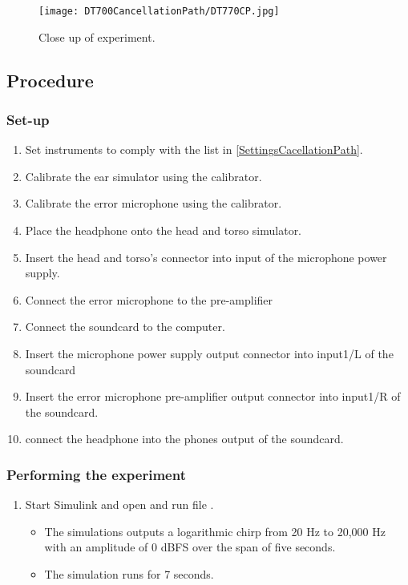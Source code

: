 \begin{figure}[H]
	\centering
	\texttt{[image: DT700CancellationPath/DT770CP.jpg]}
	\caption{Close up of experiment.}
	\label{DT770CloseUpCancellationPath}
\end{figure}
\newpage
\subsection{Procedure}
\subsubsection{Set-up}
\begin{enumerate}
	\item Set instruments to comply with the list in \ref{SettingsCacellationPath}.
	\item Calibrate the ear simulator using the calibrator.
	\item Calibrate the error microphone using the calibrator.
	\item Place the headphone onto the head and torso simulator.
	\item Insert the head and torso's connector into input of the microphone power supply.
	\item Connect the error microphone to the pre-amplifier
	\item Connect the soundcard to the computer.
	\item Insert the microphone power supply output connector into input1/L of the soundcard
	\item Insert the error microphone pre-amplifier output connector into input1/R of the soundcard.
	\item connect the headphone into the phones output of the soundcard.
\end{enumerate}


\subsubsection{Performing the experiment}
\begin{enumerate}
	\item Start Simulink\textsuperscript{\textregistered} and open and run file .
	\begin{itemize} 
		\item The simulations outputs a logarithmic chirp from 20 Hz to 20,000 Hz with an amplitude of 0 dBFS over the span of five seconds.
		\item The simulation runs for 7 seconds. 
	\end{itemize}
	
	
\end{enumerate}

